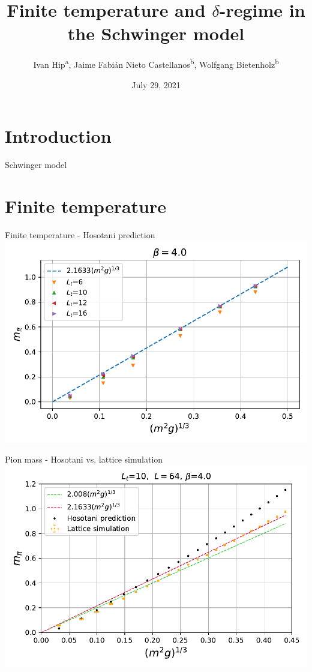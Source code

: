 \documentclass[english]{beamer}
\title{Finite temperature and $\delta$-regime in the Schwinger model}
\author{
  Ivan Hip\textsuperscript{a},
  Jaime Fabián Nieto Castellanos\textsuperscript{b},
  Wolfgang Bietenholz\textsuperscript{b}}
\institute{
  \textsuperscript{a}University of Zagreb, Croatia\\
  \textsuperscript{b}UNAM, Mexico
}
\date{July 29, 2021}
\begin{document}
 
\begin{frame}
  \titlepage
\end{frame}

\section{Introduction}

\begin{frame}{Schwinger model}
\end{frame}


\section{Finite temperature}

\begin{frame}{Finite temperature - Hosotani prediction}
  \includegraphics[width=1\textwidth]{figs/FiniteTMPiHos}
\end{frame}

\begin{frame}{Pion mass - Hosotani vs. lattice simulation}
  \includegraphics[width=1\textwidth]{figs/MPi64x10FiniteT}
\end{frame}
\end{document}

